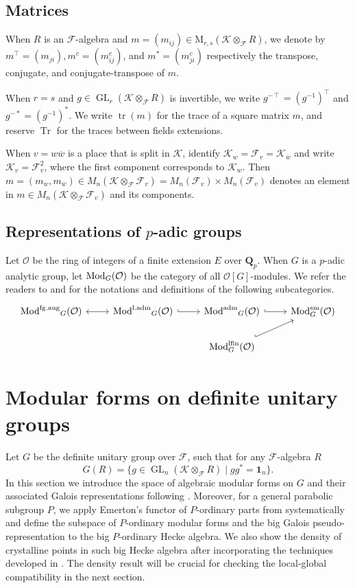 \documentclass[leqno]{amsart}
\theoremstyle{definition}
\theoremstyle{remark}
\newcommand{\id}{\mathbf{1}}
\newcommand{\oo}{\mathcal{O}}
\newcommand{\Qp}{\mathbf{Q}_p}
\DeclareMathOperator{\Tr}{Tr}
\DeclareMathOperator{\GL}{GL}
\DeclareMathOperator{\mtr}{tr}
\DeclareMathOperator{\Mod}{\textnormal{Mod}}
\DeclareMathOperator{\laMod}{\textnormal{Mod}^{\textnormal{l.adm}}}
\DeclareMathOperator{\aMod}{\textnormal{Mod}^{\textnormal{adm}}}
\DeclareMathOperator{\fgMod}{\textnormal{Mod}^{\textnormal{fg.aug}}}
\newcommand{\sm}{\textnormal{sm}}
\newcommand{\lfin}{\textnormal{lfin}}
\newcommand{\F}{{\mathcal{F}}} %
\newcommand{\K}{{\mathcal{K}}} %
\newcommand{\bw}{\overline{w}}
\begin{document}
\subsection{Matrices}
When $R$ is an $\F$-algebra and 
$m=(m_{ij})\in \text{M}_{r,s}(\K\otimes_\F R)$,
we denote by 
$m^\intercal=(m_{ji}), 
m^c=(m^c_{ij})$, and
$m^*=(m^c_{ji})$
respectively the transpose, conjugate, and conjugate-transpose of $m$.

When $r=s$ and $g\in \GL_r(\K\otimes_\F R)$ is invertible, we write
$g^{-\intercal}=(g^{-1})^\intercal$ and $g^{-*}=(g^{-1})^*$.
We write $\mtr(m)$ for the trace of a square matrix $m$,
and reserve $\Tr$ for the traces between fields extensions.

When $v=w\bw$ is a place that is split in $\K$,
identify $\K_w=\F_v=\K_{\bw}$ and 
write $\K_v=\F_v^2$, 
where the first component corresponds to $\K_w$.
Then $m=(m_w,m_{\bw})\in M_n(\K\otimes_\F\F_v)=M_n(\F_v)\times M_n(\F_v)$ 
denotes an element in $m\in M_n(\K\otimes_\F\F_v)$ and its components.

\subsection{Representations of $p$-adic groups}

Let $\oo$ be the ring of integers of a finite extension $E$
over  $\Qp$.
When $G$ is a $p$-adic analytic group,
let $\Mod_G(\oo)$ be the category
of all $\oo[G]$-modules.
We refer the readers to \cite[\S 2]{emeI} and \cite[\S 2]{pask}
for the notations and definitions of the following subcategories.
\[
\begin{tikzcd}
	\fgMod_{G}(\oo) \arrow[r,leftrightarrow] &
	\laMod_{G}(\oo) \arrow[r,hookrightarrow] &
	\aMod_{G}(\oo) \arrow[r,hookrightarrow] &
	\Mod^{\sm}_{G}(\oo) \\
					       &&
	\Mod^{\lfin}_{G}(\oo) \arrow[ru,hookrightarrow] &
\end{tikzcd}
\]






\section{Modular forms on definite unitary groups}

Let $G$ be the definite unitary group over $\F$,
such that for any $\F$-algebra $R$
\begin{equation}\label{def:def_unitary}
    G(R)=\{g\in \GL_{n}(\K\otimes_\F R) \mid gg^*=\id_n\}.
\end{equation}
In this section we introduce
the space of algebraic modular forms on $G$
and their associated Galois representations
following \cite{ger}.
Moreover, for a general parabolic subgroup $P$,
we apply Emerton's functor of $P$-ordinary parts from \cite{emeI}
systematically and define 
the subspace of $P$-ordinary modular forms
and the big Galois pseudo-representation to 
the big $P$-ordinary Hecke algebra.
We also show the density of crystalline points 
in such big Hecke algebra
after incorporating the techniques developed in \cite{pan}.
The density result will be crucial for checking
the local-global compatibility in the next section.
\end{document}
